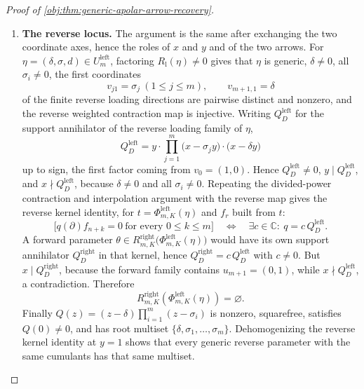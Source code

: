 \begin{proof}[Proof of \cref{obj:thm:generic-apolar-arrow-recovery}]
\begin{enumerate}
\item \textbf{The reverse locus.}  The argument is the same after exchanging the two coordinate axes, hence the roles of \(x\) and \(y\) and of the two arrows.  For \(\eta=(\delta,\sigma,d)\in U^{\mathrm{left}}_m\), factoring \(R_{\mathrm l}(\eta)\ne0\) gives that \(\eta\) is generic, \(\delta\ne0\), all \(\sigma_i\ne0\), the first coordinates
\[
v_{j1}=\sigma_j\ (1\le j\le m),
\qquad
v_{m+1,1}=\delta
\]
of the finite reverse loading directions are pairwise distinct and nonzero, and the reverse weighted contraction map is injective.  Writing \(Q_D^{\mathrm{left}}\) for the support annihilator of the reverse loading family of \(\eta\),
\[
Q_D^{\mathrm{left}}=y\cdot\prod_{j=1}^{m}\bigl(x-\sigma_jy\bigr)\cdot\bigl(x-\delta y\bigr)
\]
up to sign, the first factor coming from \(v_0=(1,0)\).  Hence \(Q_D^{\mathrm{left}}\ne0\), \(y\mid Q_D^{\mathrm{left}}\), and \(x\nmid Q_D^{\mathrm{left}}\), because \(\delta\ne0\) and all \(\sigma_i\ne0\).  Repeating the divided-power contraction and interpolation argument with the reverse map gives the reverse kernel identity, for \(t=\Phi^{\mathrm{left}}_{m,K}(\eta)\) and \(f_r\) built from \(t\):
\[
\bigl[q(\partial)f_{n+k}=0\ \text{for every }0\le k\le m\bigr]
\quad\Longleftrightarrow\quad
\exists c\in\mathbb C:\ q=c\,Q_D^{\mathrm{left}} .
\]
A forward parameter \(\theta\in R^{\mathrm{right}}_{m,K}\bigl(\Phi^{\mathrm{left}}_{m,K}(\eta)\bigr)\) would have its own support annihilator \(Q_D^{\mathrm{right}}\) in that kernel, hence \(Q_D^{\mathrm{right}}=c\,Q_D^{\mathrm{left}}\) with \(c\ne0\).  But \(x\mid Q_D^{\mathrm{right}}\), because the forward family contains \(u_{m+1}=(0,1)\), while \(x\nmid Q_D^{\mathrm{left}}\), a contradiction.  Therefore
\[
R^{\mathrm{right}}_{m,K}\!\left(\Phi^{\mathrm{left}}_{m,K}(\eta)\right)=\varnothing .
\]
Finally \(Q(z)=(z-\delta)\prod_{i=1}^m(z-\sigma_i)\) is nonzero, squarefree, satisfies \(Q(0)\ne0\), and has root multiset \(\{\delta,\sigma_1,\ldots,\sigma_m\}\).  Dehomogenizing the reverse kernel identity at \(y=1\) shows that every generic reverse parameter with the same cumulants has that same multiset.
\end{enumerate}
\end{proof}
